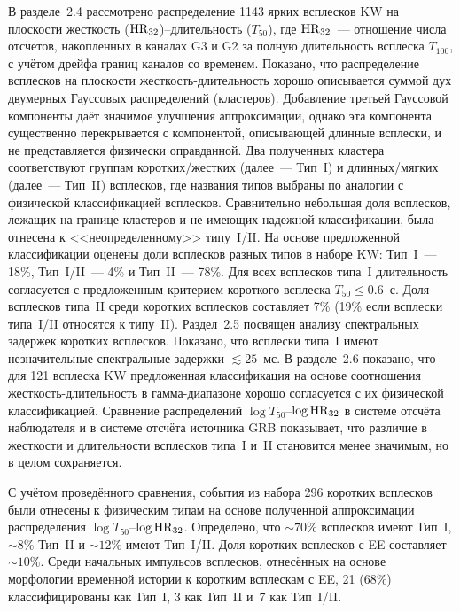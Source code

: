 В разделе~2.4 рассмотрено распределение 1143 ярких всплесков KW на плоскости 
жесткость (${\mathrm{HR}}_{32}$)--длительность ($T_{50}$),
где ${\mathrm{HR}}_{32}$~--- отношение числа отсчетов, накопленных в каналах G3 и G2 
за полную длительность всплеска $T_{100}$, с учётом дрейфа границ каналов со временем.
Показано, что распределение всплесков на плоскости жесткость-длительность 
хорошо описывается суммой дух двумерных Гауссовых распределений (кластеров).
Добавление третьей Гауссовой компоненты даёт значимое улучшения аппроксимации, однако эта 
компонента существенно перекрывается с компонентой, описывающей длинные всплески, 
и не представляется физически оправданной. 
Два полученных кластера соответствуют 
группам коротких/жестких (далее~--- Тип~I) и длинных/мягких (далее~--- Тип~II) всплесков,
где названия типов выбраны по аналогии с физической классификацией всплесков.
Сравнительно небольшая доля всплесков, лежащих на границе кластеров и не имеющих 
надежной классификации, была отнесена к <<неопределенному>> типу~I/II.
На основе предложенной классификации оценены доли всплесков разных 
типов в наборе KW: Тип~I~--- 18\%, Тип~I/II~--- 4\% и Тип~II~--- 78\%. 
Для всех всплесков типа~I длительность согласуется с предложенным критерием короткого всплеска 
$T_{50} \leq 0.6$~с. Доля всплесков типа~II среди коротких всплесков 
составляет 7\% (19\% если всплески типа~I/II относятся к типу~II).
Раздел~2.5 посвящен анализу спектральных задержек коротких всплесков. 
Показано, что всплески типа~I имеют незначительные спектральные задержки $\lesssim 25$~мс.
В разделе~2.6 показано, что для 121 всплеска KW предложенная классификация на основе 
соотношения жесткость-длительность в гамма-диапазоне хорошо согласуется 
с их физической классификацией.
Сравнение распределений $\log T_{50}$--$\log {\mathrm{HR}}_{32}$ в системе отсчёта наблюдателя 
и в системе отсчёта источника GRB показывает, что различие в жесткости и длительности
всплесков типа~I и~II становится менее значимым, но в целом сохраняется.

С учётом проведённого сравнения, события из набора 296 коротких всплесков 
были отнесены к физическим типам на основе полученной аппроксимации 
распределения $\log T_{50}$--$\log {\mathrm{HR}}_{32}$. 
Определено, что $\sim 70$\% всплесков имеют Тип~I, 
$\sim 8$\% Тип~II и $\sim 12$\% имеют Тип~I/II. 
Доля коротких всплесков с EE составляет $\sim 10$\%.
Среди начальных импульсов всплесков, отнесённых на основе морфологии временной 
истории к коротким всплескам с EE, 21 (68\%) классифицированы как Тип~I, 3 как Тип~II 
и~7 как Тип~I/II.


